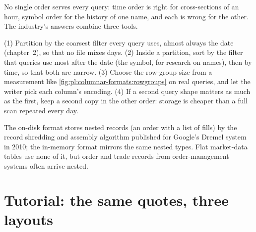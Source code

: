 No single order serves every query: time order is right for cross-sections of an hour, symbol order for the history of one name,
and each is wrong for the other. The industry's answers combine three tools.

\begin{method}\label{met:pl:columnar-formats:layout}
(1) Partition by the coarsest filter every query uses, almost always the date (chapter~2), so that no file mixes days.
(2) Inside a partition, sort by the filter that queries use most after the date (the symbol, for research on names), then by
time, so that both  are narrow. (3) Choose the row-group size from a measurement like
\cref{fig:pl:columnar-formats:rowgroups} on real queries, and let the writer pick each column's encoding. (4) If a second query
shape matters as much as the first, keep a second copy in the other order: storage is cheaper than a full scan repeated every
day.
\end{method}

\begin{remark}\label{rem:pl:columnar-formats:dremel}
The on-disk format stores nested records (an order with a list of fills) by the record shredding and assembly algorithm
published for Google's Dremel system in 2010; the in-memory format mirrors the same nested types. Flat market-data tables use
none of it, but order and trade records from order-management systems often arrive nested.
\end{remark}

\section{Tutorial: the same quotes, three layouts}\label{tut:pl:columnar-formats:tut}

